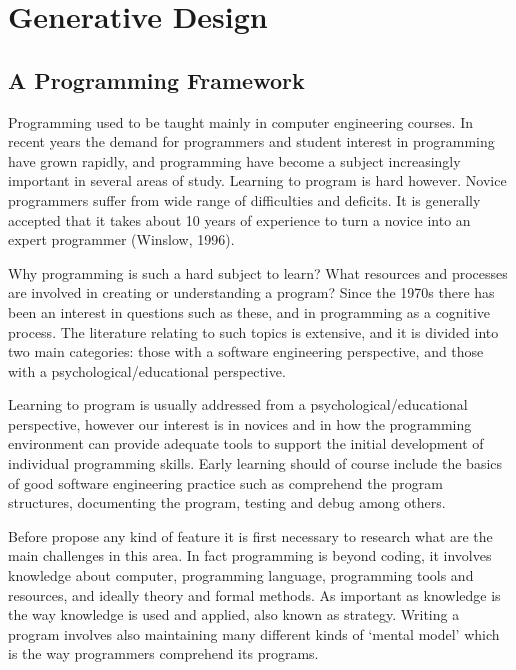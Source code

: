 

\chapter{Generative Design}
\label{chapter:generativeDesign}

\section{A Programming Framework}

Programming used to be taught mainly in computer engineering courses. In recent years the demand for programmers and student interest in programming have grown rapidly, and programming have become a subject increasingly important in several areas of study. Learning to program is hard however. Novice programmers suffer from wide range of difficulties and deficits. It is generally accepted that it takes about 10 years of experience to turn a novice into an expert programmer (Winslow, 1996).

Why programming is such a hard subject to learn? What resources and
processes are involved in creating or understanding a program? Since the 1970s there has been an interest in questions such as these, and in programming as a cognitive process. The literature relating to such topics is extensive, and it is divided into two main categories: those with a software engineering perspective, and those with a psychological/educational perspective.

Learning to program is usually addressed from a psychological/educational perspective, however our interest is in novices and in how the programming environment can provide adequate tools to support the initial development of individual programming skills. Early learning should of course include the basics of good software engineering practice such as comprehend the program structures, documenting the program, testing and debug among others.

Before propose any kind of feature it is first necessary to research what are the main challenges in this area. In fact programming is beyond coding, it involves knowledge about computer, programming language, programming tools and resources, and ideally theory and formal methods. As important as knowledge is the way knowledge is used and applied, also known as strategy. Writing a program involves also maintaining many different kinds of ‘mental model’ which is the way programmers comprehend its programs.

